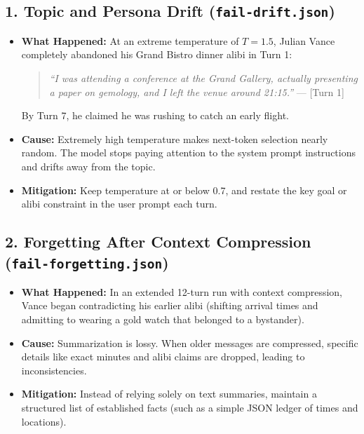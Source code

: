 \documentclass[11pt,a4paper]{article}
\begin{document}
\subsection{1. Topic and Persona Drift (\texttt{fail-drift.json})}
\begin{itemize}
    \item \textbf{What Happened:} At an extreme temperature of $T=1.5$, Julian Vance completely abandoned his Grand Bistro dinner alibi in Turn 1:
    \begin{quote}
    \small \textit{``I was attending a conference at the Grand Gallery, actually presenting a paper on gemology, and I left the venue around 21:15.''} \hfill --- [Turn 1]
    \end{quote}
    By Turn 7, he claimed he was rushing to catch an early flight.
    \item \textbf{Cause:} Extremely high temperature makes next-token selection nearly random. The model stops paying attention to the system prompt instructions and drifts away from the topic.
    \item \textbf{Mitigation:} Keep temperature at or below 0.7, and restate the key goal or alibi constraint in the user prompt each turn.
\end{itemize}

\subsection{2. Forgetting After Context Compression (\texttt{fail-forgetting.json})}
\begin{itemize}
    \item \textbf{What Happened:} In an extended 12-turn run with context compression, Vance began contradicting his earlier alibi (shifting arrival times and admitting to wearing a gold watch that belonged to a bystander).
    \item \textbf{Cause:} Summarization is lossy. When older messages are compressed, specific details like exact minutes and alibi claims are dropped, leading to inconsistencies.
    \item \textbf{Mitigation:} Instead of relying solely on text summaries, maintain a structured list of established facts (such as a simple JSON ledger of times and locations).
\end{itemize}
\end{document}
